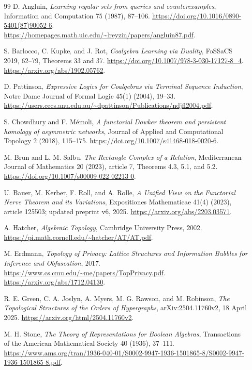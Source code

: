 \documentclass[11pt]{article}
\theoremstyle{definition}
\begin{document}
\begin{thebibliography}{99}
D. Angluin, \emph{Learning regular sets from queries and counterexamples},
Information and Computation 75 (1987), 87--106.
\url{https://doi.org/10.1016/0890-5401(87)90052-6}.
\url{https://homepages.math.uic.edu/~lreyzin/papers/angluin87.pdf}.

S. Barlocco, C. Kupke, and J. Rot,
\emph{Coalgebra Learning via Duality}, FoSSaCS 2019, 62--79,
Theorems 33 and 37.
\url{https://doi.org/10.1007/978-3-030-17127-8_4}.
\url{https://arxiv.org/abs/1902.05762}.

D. Pattinson, \emph{Expressive Logics for Coalgebras via Terminal Sequence
Induction}, Notre Dame Journal of Formal Logic 45(1) (2004), 19--33.
\url{https://users.cecs.anu.edu.au/~dpattinson/Publications/ndjfl2004.pdf}.

S. Chowdhury and F. M\'emoli,
\emph{A functorial Dowker theorem and persistent homology of asymmetric
networks}, Journal of Applied and Computational Topology 2 (2018), 115--175.
\url{https://doi.org/10.1007/s41468-018-0020-6}.

M. Brun and L. M. Salbu, \emph{The Rectangle Complex of a Relation},
Mediterranean Journal of Mathematics 20 (2023), article 7,
Theorems 4.3, 5.1, and 5.2.
\url{https://doi.org/10.1007/s00009-022-02213-0}.

U. Bauer, M. Kerber, F. Roll, and A. Rolle,
\emph{A Unified View on the Functorial Nerve Theorem and its Variations},
Expositiones Mathematicae 41(4) (2023), article 125503;
updated preprint v6, 2025.
\url{https://arxiv.org/abs/2203.03571}.

A. Hatcher, \emph{Algebraic Topology}, Cambridge University Press, 2002.
\url{https://pi.math.cornell.edu/~hatcher/AT/AT.pdf}.

M. Erdmann, \emph{Topology of Privacy: Lattice Structures and Information
Bubbles for Inference and Obfuscation}, 2017.
\url{https://www.cs.cmu.edu/~me/papers/TopPrivacy.pdf}.
\url{https://arxiv.org/abs/1712.04130}.

R. E. Green, C. A. Joslyn, A. Myers, M. G. Rawson, and M. Robinson,
\emph{The Topological Structures of the Orders of Hypergraphs},
arXiv:2504.11760v2, 18 April 2025.
\url{https://arxiv.org/html/2504.11760v2}.

M. H. Stone, \emph{The Theory of Representations for Boolean Algebras},
Transactions of the American Mathematical Society 40 (1936), 37--111.
\url{https://www.ams.org/tran/1936-040-01/S0002-9947-1936-1501865-8/S0002-9947-1936-1501865-8.pdf}.


\end{thebibliography}
\end{document}
